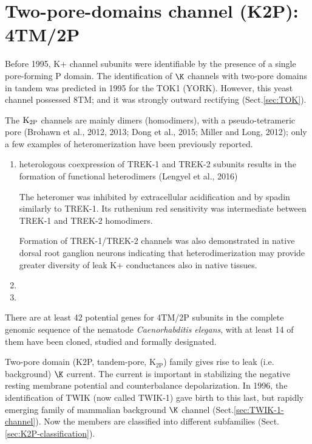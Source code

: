 \section{Two-pore-domains channel (K2P): 4TM/2P}
\label{sec:K2P}
\label{sec:tandem-pore-domain-K+-channel}

Before 1995, K+ channel subunits were identifiable by the presence of a single
pore-forming P domain. The identification of $\K$ channels with two-pore domains
in tandem was predicted in 1995 for the TOK1 (YORK). However, this yeast channel
possessed 8TM; and it was strongly outward rectifying (Sect.\ref{sec:TOK}).

The ${\text{K}_{\text{2P}}}$ channels are mainly dimers (homodimers), with a pseudo-tetrameric
pore (Brohawn et al., 2012, 2013; Dong et al., 2015; Miller and Long, 2012); 
only a few examples of heteromerization have been previously reported.
\begin{enumerate}
  \item heterologous coexpression of TREK-1 and TREK-2 subunits results in the
  formation of functional heterodimers (Lengyel et al., 2016)
  
The heteromer was inhibited by extracellular acidification and by spadin
similarly to TREK-1. Its ruthenium red sensitivity was intermediate
between TREK-1 and TREK-2 homodimers.

 Formation of TREK-1/TREK-2 channels was also demonstrated in native dorsal root
ganglion neurons indicating that heterodimerization may provide greater
diversity of leak K+ conductances also in native tissues.  
\item 
  \item 
\end{enumerate}

There are at least 42 potential genes for 4TM/2P subunits in the complete
genomic sequence of the nematode {\it Caenorhabditis elegans}, with at least 14
of them have been cloned, studied and formally designated.

Two-pore domain (K2P, tandem-pore, K$_\text{2P}$) family gives rise to leak
(i.e. background) $\K$ current. The current is important in stabilizing the
negative resting membrane potential and counterbalance depolarization.
In 1996, the identification of TWIK (now called TWIK-1) gave birth to this last,
but rapidly emerging family of mammalian background $\K$ channel
(Sect.\ref{sec:TWIK-1-channel}). Now the members are classified into different
subfamilies (Sect.\ref{sec:K2P-classification}).


